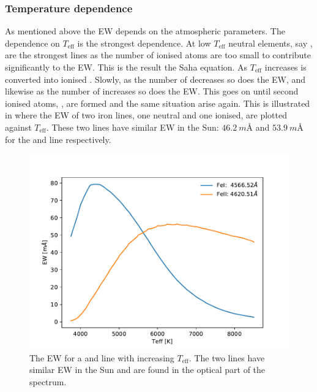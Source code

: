 \subsubsection{Temperature dependence}

As mentioned above the EW depends on the atmospheric parameters. The dependence
on $T_\mathrm{eff}$ is the strongest dependence. At low $T_\mathrm{eff}$ neutral
elements, say , are the strongest lines as the number of ionised
atoms are too small to contribute significantly to the EW. This is the result
the Saha equation. As $T_\mathrm{eff}$ increases  is converted into
ionised . Slowly, as the number of  decreases so does the
EW, and likewise as the number of  increases so does the EW. This
goes on until second ionised atoms, , are formed and the same
situation arise again. This is illustrated in  where the EW of
two iron lines, one neutral and one ionised, are plotted against
$T_\mathrm{eff}$. These two lines have similar EW in the Sun:
$\SI{46.2}{m}$\AA{} and $\SI{53.9}{m}$\AA{} for the  and 
line respectively.

\begin{figure}[htpb!]
    \centering
    \includegraphics[width=1.0\linewidth]{figures/ewTeff.pdf}
    \caption{The EW for a  and  line with increasing
             $T_\mathrm{eff}$. The two lines have similar EW in the Sun and are
             found in the optical part of the spectrum.}
    \label{fig:ewTeff}
\end{figure}


